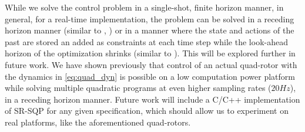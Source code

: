 While we solve the control problem in a single-shot, finite horizon manner, in general, for a real-time implementation, the problem can be solved in a receding horizon manner (similar to \cite{PantAMNDM15_Anytime}, \cite{Jain2016}) or in a manner where the state and actions of the past are stored an added as constraints at each time step while the look-ahead horizon of the optimization shrinks (similar to \cite{Raman14_MPCSTL}). This will be explored further in future work. We have shown previously \cite{PantAMNDM15_Anytime} that control of an actual quad-rotor with the dynamics in \eqref{eq:quad_dyn} is possible on a low computation power platform while solving multiple quadratic programs at even higher sampling rates ($20Hz$), in a receding horizon manner. Future work will include a C/C++ implementation of SR-SQP for any given specification, which should allow us to experiment on real platforms, like the aforementioned quad-rotors.
